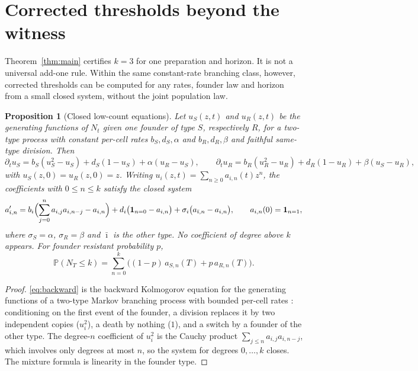 \documentclass[11pt,a4paper]{article}
\theoremstyle{plain}
\newtheorem{proposition}[theorem]{Proposition}
\theoremstyle{definition}
\theoremstyle{remark}
\newcommand{\PP}{\mathbb P}
\newcommand{\ind}{\mathbf 1}
\begin{document}
\section{Corrected thresholds beyond the witness}\label{sec:thresholds}

Theorem~\ref{thm:main} certifies $k=3$ for one preparation and horizon. It is not a universal add-one rule. Within the same constant-rate branching class, however, corrected thresholds can be computed for any rates, founder law and horizon from a small closed system, without the joint population law.

\begin{proposition}[Closed low-count equations]\label{prop:lowcount}
Let $u_S(z,t)$ and $u_R(z,t)$ be the generating functions of $N_t$ given one founder of type $S$, respectively $R$, for a two-type process with constant per-cell rates $b_S,d_S,\alpha$ and $b_R,d_R,\beta$ and faithful same-type division. Then
\begin{equation}\label{eq:backward}
\partial_tu_S=b_S(u_S^2-u_S)+d_S(1-u_S)+\alpha(u_R-u_S),\qquad
\partial_tu_R=b_R(u_R^2-u_R)+d_R(1-u_R)+\beta(u_S-u_R),
\end{equation}
with $u_S(z,0)=u_R(z,0)=z$. Writing $u_i(z,t)=\sum_{n\ge0}a_{i,n}(t)z^n$, the coefficients with $0\le n\le k$ satisfy the closed system
\begin{equation}\label{eq:coefficients}
a_{i,n}'=b_i\Bigl(\sum_{j=0}^{n}a_{i,j}a_{i,n-j}-a_{i,n}\Bigr)+d_i\bigl(\ind_{n=0}-a_{i,n}\bigr)+\sigma_i\bigl(a_{\bar\imath,n}-a_{i,n}\bigr),
\qquad a_{i,n}(0)=\ind_{n=1},
\end{equation}
where $\sigma_S=\alpha$, $\sigma_R=\beta$ and $\bar\imath$ is the other type. No coefficient of degree above $k$ appears. For founder resistant probability $p$,
\[
\PP(N_T\le k)=\sum_{n=0}^{k}\bigl((1-p)\,a_{S,n}(T)+p\,a_{R,n}(T)\bigr).
\]
\end{proposition}
\begin{proof}
\eqref{eq:backward} is the backward Kolmogorov equation for the generating functions of a two-type Markov branching process with bounded per-cell rates \citep[Chapter~V]{athreyaney1972}: conditioning on the first event of the founder, a division replaces it by two independent copies ($u_i^2$), a death by nothing ($1$), and a switch by a founder of the other type. The degree-$n$ coefficient of $u_i^2$ is the Cauchy product $\sum_{j\le n}a_{i,j}a_{i,n-j}$, which involves only degrees at most $n$, so the system for degrees $0,\dots,k$ closes. The mixture formula is linearity in the founder type.
\end{proof}
\end{document}
